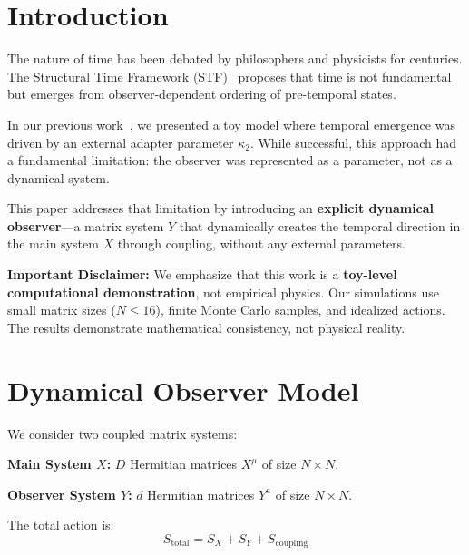 \documentclass[12pt,a4paper]{article}
\begin{document}
\tableofcontents
\newpage

\section{Introduction}\label{sec:intro}

The nature of time has been debated by philosophers and physicists for 
centuries. The Structural Time Framework (STF)~\cite{chanpengpad_stf} 
proposes that time is not fundamental but emerges from observer-dependent 
ordering of pre-temporal states.

In our previous work~\cite{chanpengpad_sgoed_v2}, we presented a toy 
model where temporal emergence was driven by an external adapter parameter 
$\kappa_2$. While successful, this approach had a fundamental limitation: 
the observer was represented as a parameter, not as a dynamical system.

This paper addresses that limitation by introducing an \textbf{explicit 
dynamical observer}---a matrix system $Y$ that dynamically creates the 
temporal direction in the main system $X$ through coupling, without any 
external parameters.

\textbf{Important Disclaimer:} We emphasize that this work is a 
\textbf{toy-level computational demonstration}, not empirical physics. 
Our simulations use small matrix sizes ($N \leq 16$), finite Monte Carlo 
samples, and idealized actions. The results demonstrate mathematical 
consistency, not physical reality.

\section{Dynamical Observer Model}\label{sec:model}

We consider two coupled matrix systems:

\textbf{Main System $X$:} $D$ Hermitian matrices $X^\mu$ of size $N \times N$.

\textbf{Observer System $Y$:} $d$ Hermitian matrices $Y^a$ of size $N \times N$.

The total action is:
\begin{equation}
S_{\text{total}} = S_X + S_Y + S_{\text{coupling}}
\end{equation}
\end{document}
